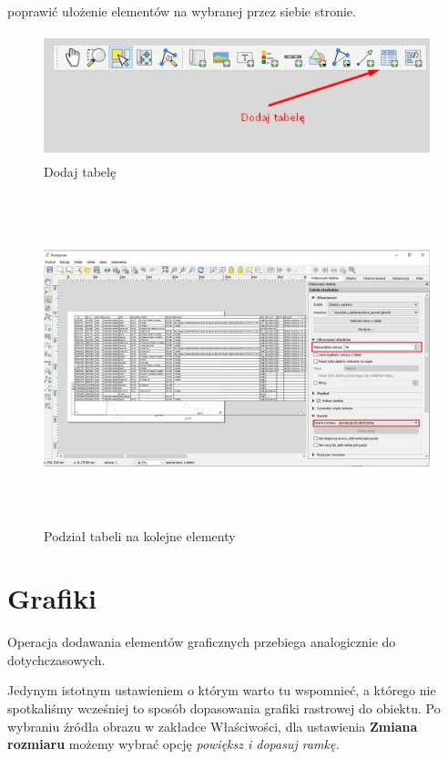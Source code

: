 \documentclass[12pt,a4paper]{book}
\begin{document}
poprawić ułożenie elementów na wybranej przez siebie stronie.
\begin{center}
\begin{figure}
\caption{Dodaj tabelę}
\includegraphics[width=12.298cm,height=3.637cm]{008-tabela.png}
\end{figure}
\end{center}
\begin{center}
\begin{figure}
\includegraphics[width=17cm,height=9.571cm]{008-tabela-elementy.jpg}
\caption{Podział tabeli na kolejne elementy}
\end{figure}
\end{center}

\section{Grafiki}
Operacja dodawania elementów graficznych przebiega analogicznie do dotychczasowych.

Jedynym istotnym ustawieniem o którym warto tu wspomnieć, a którego nie spotkaliśmy wcześniej to sposób dopasowania grafiki rastrowej do obiektu. Po wybraniu źródła obrazu w zakładce Właściwości, dla ustawienia \textbf{Zmiana rozmiaru} możemy wybrać opcję \textit{powiększ i dopasuj ramkę.}
\end{document}
